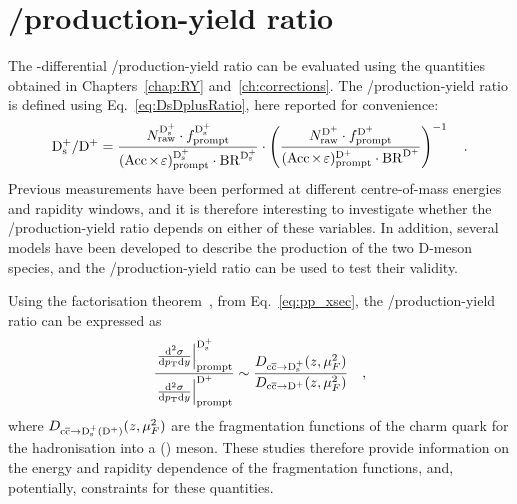 \chapter{\texorpdfstring{\ds/\dpl production-yield ratio}{Ds+/D+ production-yield ratio}}\label{ch:results}
The \pt-differential \ds/\dpl production-yield ratio can be evaluated using the quantities obtained in Chapters~\ref{chap:RY} and~\ref{ch:corrections}. The \ds/\dpl production-yield ratio is defined using Eq.~\ref{eq:DsDplusRatio}, here reported for convenience:
\begin{equation*}
    \mathrm{D_s^+}/\mathrm{D^+} = \frac{N_\mathrm{raw}^{\mathrm{D_s^+}}\cdot f_\mathrm{prompt}^\mathrm{D_s^+}}{(\mathrm{Acc}\mkern-2mu\times\mkern-2mu\varepsilon)_\mathrm{prompt}^\mathrm{D_s^+} \cdot \mathrm{BR}^\mathrm{D_s^+}} \cdot \left(\frac{N_\mathrm{raw}^{\mathrm{D^+}}\cdot f_\mathrm{prompt}^\mathrm{D^+}}{(\mathrm{Acc}\mkern-2mu\times\mkern-2mu\varepsilon)_\mathrm{prompt}^\mathrm{D^+} \cdot \mathrm{BR}^\mathrm{D^+}}\right)^{-1}\quad .
\end{equation*}
Previous measurements have been performed at different centre-of-mass energies and rapidity windows, and it is therefore interesting to investigate whether the \ds/\dpl production-yield ratio depends on either of these variables. In addition, several models have been developed to describe the production of the two D-meson species, and the \ds/\dpl production-yield ratio can be used to test their validity. 

Using the factorisation theorem~\cite{Collins:1989gx}, from Eq.~\ref{eq:pp_xsec}, the \ds/\dpl production-yield ratio can be expressed as
\begin{equation*}
    \frac{\left.\frac{\mathrm{d}^2\sigma}{\mathrm{d}p_\mathrm{T}\mathrm{d} y}\right\vert^\mathrm{D_s^+}_\mathrm{prompt}}{\left.\frac{\mathrm{d}^2\sigma}{\mathrm{d}p_\mathrm{T}\mathrm{d} y}\right\vert^\mathrm{D^+}_\mathrm{prompt}} \sim \frac{D_\mathrm{c\overline{c}\rightarrow \mathrm{D_s^+}}(z,\mu_F^2)}{D_\mathrm{c\overline{c}\rightarrow \mathrm{D^+}}(z,\mu_F^2)}\quad ,
\end{equation*}
where $D_\mathrm{c\overline{c}\rightarrow \mathrm{D_s^+} (\mathrm{D^+})}(z,\mu_F^2)$ are the fragmentation functions of the charm quark for the hadronisation into a \ds (\dpl) meson. These studies therefore provide information on the energy and rapidity dependence of the fragmentation functions, and, potentially, constraints for these quantities. 

